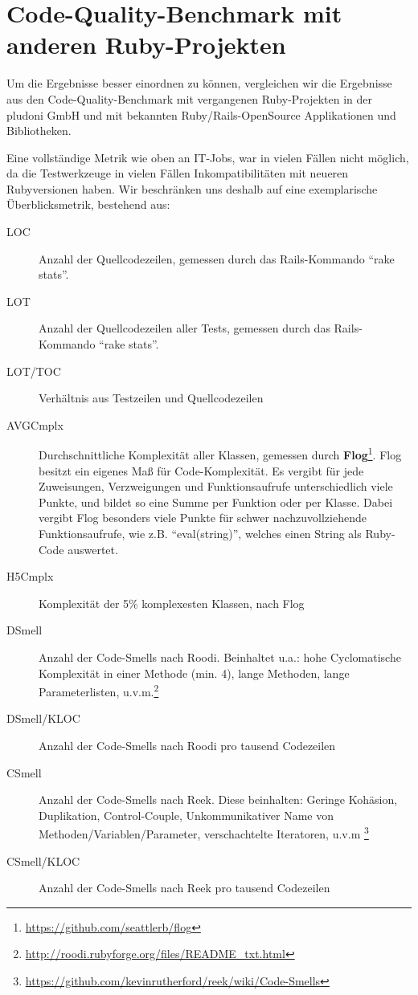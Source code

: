 

\section{Code-Quality-Benchmark mit anderen Ruby-Projekten}

Um die Ergebnisse besser einordnen zu können, vergleichen wir die Ergebnisse aus den Code-Quality-Benchmark mit vergangenen Ruby-Projekten in der pludoni GmbH und mit bekannten Ruby/Rails-OpenSource Applikationen und Bibliotheken.

Eine vollständige Metrik wie oben an IT-Jobs, war in vielen Fällen nicht möglich, da die Testwerkzeuge in vielen Fällen Inkompatibilitäten mit neueren Rubyversionen haben. Wir beschränken uns deshalb auf eine exemplarische Überblicksmetrik, bestehend aus:

\begin{description}
 \item[LOC] Anzahl der Quellcodezeilen, gemessen durch das Rails-Kommando "`rake stats"'. 
 \item[LOT] Anzahl der Quellcodezeilen aller Tests, gemessen durch das Rails-Kommando "`rake stats"'. 
 \item[LOT/TOC] Verhältnis aus Testzeilen und Quellcodezeilen
 \item[AVGCmplx] Durchschnittliche Komplexität aller Klassen, gemessen durch \textbf{Flog}\footnote{\url{https://github.com/seattlerb/flog}}. Flog besitzt ein eigenes Maß für Code-Komplexität. Es vergibt für jede Zuweisungen, Verzweigungen und Funktionsaufrufe unterschiedlich viele Punkte, und bildet so eine Summe per Funktion oder per Klasse. Dabei vergibt Flog besonders viele Punkte für schwer nachzuvollziehende Funktionsaufrufe, wie z.B. "`eval(string)"', welches einen String als Ruby-Code auswertet.
 \item[H5Cmplx] Komplexität der 5\% komplexesten Klassen, nach Flog
 \item[DSmell] Anzahl der Code-Smells nach Roodi. Beinhaltet u.a.: hohe Cyclomatische Komplexität in einer Methode (min. 4), lange Methoden, lange Parameterlisten, u.v.m.\footnote{\url{http://roodi.rubyforge.org/files/README_txt.html}}
 \item[DSmell/KLOC] Anzahl der Code-Smells nach Roodi pro tausend Codezeilen
 \item[CSmell] Anzahl der Code-Smells nach Reek. Diese beinhalten: Geringe Kohäsion, Duplikation, Control-Couple, Unkommunikativer Name von Methoden/Variablen/Parameter, verschachtelte Iteratoren, u.v.m  \footnote{\url{https://github.com/kevinrutherford/reek/wiki/Code-Smells}}
 \item[CSmell/KLOC] Anzahl der Code-Smells nach Reek pro tausend Codezeilen
\end{description}








